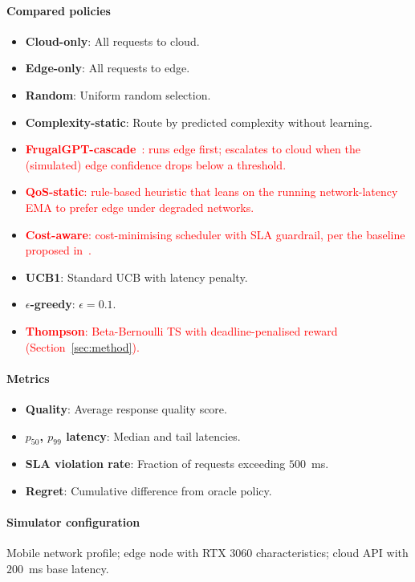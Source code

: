 \documentclass[final,3p,twocolumn,authoryear]{elsarticle}
\newcommand{\rev}[1]{\textcolor{red}{#1}}
\theoremstyle{plain}
\theoremstyle{definition}
\begin{document}
\paragraph{Compared policies}
\begin{itemize}
  \item \textbf{Cloud-only}: All requests to cloud.
  \item \textbf{Edge-only}: All requests to edge.
  \item \textbf{Random}: Uniform random selection.
  \item \textbf{Complexity-static}: Route by predicted complexity without learning.
  \item \rev{\textbf{FrugalGPT-cascade}~\citep{chen2023frugalgpt}: runs edge first; escalates to cloud when the (simulated) edge confidence drops below a threshold.}
  \item \rev{\textbf{QoS-static}: rule-based heuristic that leans on the running network-latency EMA to prefer edge under degraded networks.}
  \item \rev{\textbf{Cost-aware}: cost-minimising scheduler with SLA guardrail, per the baseline proposed in~\citep{zhang2023shepherd}.}
  \item \textbf{UCB1}: Standard UCB with latency penalty.
  \item \textbf{$\epsilon$-greedy}: $\epsilon = 0.1$.
  \item \rev{\textbf{Thompson}: Beta-Bernoulli TS with deadline-penalised reward (Section~\ref{sec:method}).}
\end{itemize}

\paragraph{Metrics}
\begin{itemize}
  \item \textbf{Quality}: Average response quality score.
  \item \textbf{$p_{50}$, $p_{99}$ latency}: Median and tail latencies.
  \item \textbf{SLA violation rate}: Fraction of requests exceeding $500$~ms.
  \item \textbf{Regret}: Cumulative difference from oracle policy.
\end{itemize}

\paragraph{Simulator configuration}
Mobile network profile; edge node with RTX 3060 characteristics; cloud API with $200$~ms base latency.
\end{document}
